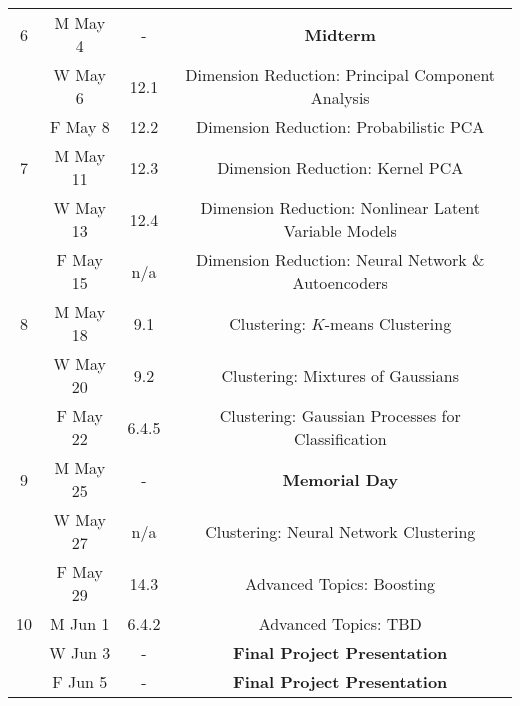 \documentclass[11pt]{article}
\begin{document}
\begin{tabular*}{\textwidth}{cccc}
6 & M May 4  &    -    & \textbf{Midterm} \\
  & W May 6  &   12.1  & Dimension Reduction: Principal Component Analysis \\
  & F May 8  &   12.2  & Dimension Reduction: Probabilistic PCA \\ %
 
\hline

7 & M May 11 &   12.3  & Dimension Reduction: Kernel PCA \\
  & W May 13 &   12.4  & Dimension Reduction: Nonlinear Latent Variable Models \\
  & F May 15 &   n/a   & Dimension Reduction: Neural Network \& Autoencoders \\
 
\hline

8 & M May 18 &   9.1   & Clustering: $K$-means Clustering \\  
  & W May 20 &   9.2   & Clustering: Mixtures of Gaussians \\
  & F May 22 &  6.4.5  & Clustering: Gaussian Processes for Classification \\
 
\hline

9 & M May 25 &    -    & \textbf{Memorial Day} \\
  & W May 27 &   n/a   & Clustering: Neural Network Clustering \\
  & F May 29 &   14.3  & Advanced Topics: Boosting \\ %
 
\hline

10& M Jun 1  &  6.4.2  & Advanced Topics: TBD \\ %
  & W Jun 3  &    -    & \textbf{Final Project Presentation} \\
  & F Jun 5  &    -    & \textbf{Final Project Presentation} \\
 
\hline
\end{tabular*}
\end{document}
